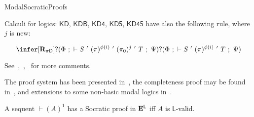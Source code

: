 \begin{entry}{ModalSocraticProofs}
\begin{calculus}
\smallskip

Calculi for logics: $\mathsf{KD}$, $\mathsf{KDB}$, $\mathsf{KD4}$, $\mathsf{KD5}$, $\mathsf{KD45}$ have also the following rule, where $j$ is new:

$$
\infer[\mathbf{R}_{\pi\mathsf{D}}]{?(\Phi ~;~ \vdash S ~'~ (\pi)^{\phi(i)} ~'~ (\pi_0)^{j} ~'~ T ~;~ \Psi)}{?(\Phi ~;~ \vdash S ~'~ (\pi)^{\phi(i)} ~'~ T ~;~ \Psi)}
$$
\end{calculus}

\begin{clarifications}
See~,~,~ for more comments.
\end{clarifications}

\begin{history}
The proof system has been presented in~\cite{DLJ:2004}, the completeness proof may be found in~\cite{DLJ:2007}, and extensions to some non-basic modal logics in~\cite{DLJ:2008}.
\end{history}

\begin{technicalities}
A sequent $\vdash (A)^1$ has a Socratic proof in $\mathbf{E}^\mathsf{L}$ iff $A$ is $\mathsf{L}$-valid.
\end{technicalities}













\end{entry}
